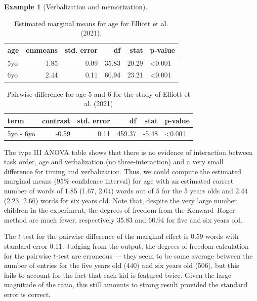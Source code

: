 \documentclass[
  11pt,
  letterpaper,
]{scrbook}
\theoremstyle{definition}
\theoremstyle{definition}
\newtheorem{example}{Example}[chapter]
\theoremstyle{remark}
\begin{document}
\begin{example}[Verbalization and
memorization]
\begin{longtable}[]{@{}lrrrrl@{}}

\caption{\label{tbl-Elliot-emmeans}Estimated marginal means for age for
Elliott et al. (2021).}

\tabularnewline

\toprule\noalign{}
age & emmeans & std. error & df & stat & p-value \\
\midrule\noalign{}
\endhead
\bottomrule\noalign{}
\endlastfoot
5yo & 1.85 & 0.09 & 35.83 & 20.29 & \textless0.001 \\
6yo & 2.44 & 0.11 & 60.94 & 23.21 & \textless0.001 \\

\end{longtable}

\begin{longtable}[]{@{}lrrrrl@{}}

\caption{\label{tbl-Elliot-pairdiff}Pairwise difference for age 5 and 6
for the study of Elliott et al. (2021)}

\tabularnewline

\toprule\noalign{}
term & contrast & std. error & df & stat & p-value \\
\midrule\noalign{}
\endhead
\bottomrule\noalign{}
\endlastfoot
5yo - 6yo & -0.59 & 0.11 & 459.37 & -5.48 & \textless0.001 \\

\end{longtable}

The type III ANOVA table shows that there is no evidence of interaction
between task order, age and verbalization (no three-interaction) and a
very small difference for timing and verbalization. Thus, we could
compute the estimated marginal means (95\% confidence interval) for age
with an estimated correct number of words of 1.85 (1.67, 2.04) words out
of 5 for the 5 years olds and 2.44 (2.23, 2.66) words for six years old.
Note that, despite the very large number children in the experiment, the
degrees of freedom from the Kenward--Roger method are much fewer,
respectively 35.83 and 60.94 for five and six years old.

The \(t\)-test for the pairwise difference of the marginal effect is
0.59 words with standard error 0.11. Judging from the output, the
degrees of freedom calculation for the pairwise \(t\)-test are erroneous
--- they seem to be some average between the number of entries for the
five years old (440) and six years old (506), but this fails to account
for the fact that each kid is featured twice. Given the large magnitude
of the ratio, this still amounts to strong result provided the standard
error is correct.


\end{example}
\end{document}
